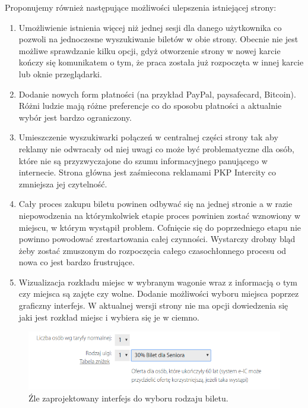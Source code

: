 \documentclass[12pt, a4paper, oneside]{report}
\begin{document}
Proponujemy również następujące możliwości ulepszenia istniejącej strony:

\begin{enumerate}
    \item Umożliwienie istnienia więcej niż jednej sesji dla danego użytkownika 
    co pozwoli na jednoczesne wyszukiwanie biletów w obie strony. Obecnie nie 
    jest możliwe sprawdzanie kilku opcji, gdyż otworzenie strony w nowej karcie 
    kończy się komunikatem o tym, że praca została już rozpoczęta w innej 
    karcie lub oknie przeglądarki.
    \item Dodanie nowych form płatności (na przykład PayPal, paysafecard, 
    Bitcoin). Różni ludzie mają różne preferencje co do sposobu płatności a 
    aktualnie wybór jest bardzo ograniczony.
    \item Umieszczenie wyszukiwarki połączeń w centralnej części strony tak aby 
    reklamy nie odwracały od niej uwagi co może być problematyczne dla osób, 
    które nie są przyzwyczajone do szumu informacyjnego panującego w 
    internecie. Strona główna jest zaśmiecona reklamami PKP Intercity co 
    zmniejsza jej czytelność.
    \item Cały proces zakupu biletu powinen odbywać się na jednej stronie a w 
    razie niepowodzenia na którymkolwiek etapie proces powinien zostać 
    wznowiony w miejscu, w którym wystąpił problem. Cofnięcie się do 
    poprzedniego etapu nie powinno powodować zrestartowania całej
    czynności. Wystarczy drobny bląd żeby zostać zmuszonym do rozpoczęcia całego
    czasochłonnego procesu od nowa co jest bardzo frustrujące.
    \item Wizualizacja rozkładu miejsc w wybranym wagonie wraz z informacją o 
    tym czy miejsca są zajęte czy wolne. Dodanie możliwości wyboru miejsca poprzez graficzny interfejs. W aktualnej wersji strony nie ma opcji 
    dowiedzenia się jaki jest rozkład  miejsc i wybiera się je w ciemno.
\end{enumerate}

\begin{figure}[H]
    \centering
    \includegraphics[scale=0.55]{./pkp-ticket-type.png}
    \caption{Źle zaprojektowany interfejs do wyboru rodzaju biletu.}
    \label{}
\end{figure}
\end{document}
